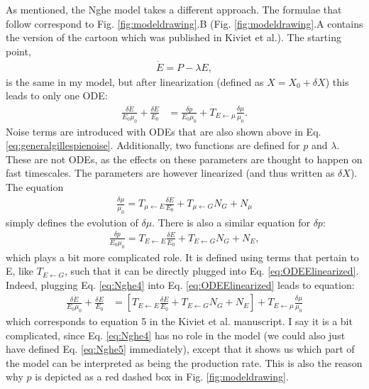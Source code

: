 As mentioned, the Nghe model takes a different approach. 
The formulae that follow correspond to Fig. \ref{fig:modeldrawing}.B (Fig. \ref{fig:modeldrawing}.A contains the version of the cartoon which was published in Kiviet et al.).
The starting point,
%
\begin{align}
\label{eq:Nghe1}
\dot{E} = P - \lambda E
,
\end{align}
%
is the same in my model, but after linearization (defined as $X=X_0+\delta X$) this leads to only one ODE:
%
\begin{align}
\label{eq:ODEElinearized}
\frac{ \delta{\dot{E}} }{E_0 \mu_0} 
+ \frac{\delta E}{E_0} 
& =
\frac{\delta p}{E_0 \mu_0} + T_{E \leftarrow \mu} \frac{\delta \mu}{\mu_0}
.
\end{align}
%
Noise terms are introduced with ODEs that are also shown above in Eq. \ref{eq:generalgillespienoise}.
 Additionally, two functions are defined for $p$ and $\lambda$. These are not ODEs, as the effects on these parameters are thought to happen on fast timescales. The parameters are however linearized (and thus written as $\delta X$). The equation
%
\begin{align}
\label{eq:Nghe3}
\frac{\delta\mu}{\mu_0} = T_{\mu \leftarrow E} \frac{\delta E}{E_0} + T_{\mu \leftarrow G} N_G + N_\mu
\end{align}
%
simply defines the evolution of $\delta \mu$.
There is also a similar equation for $\delta p$:
%
\begin{align}
\label{eq:Nghe4}
\frac{\delta{p}}{E_0 \mu_0} = T_{E \leftarrow E} \frac{\delta E}{E_0} + T_{E \leftarrow G} N_G + N_E
,
\end{align}
%
which plays a bit more complicated role.
It is defined using terms that pertain to E, like $T_{E \leftarrow G}$, such that it can be directly plugged into Eq. \ref{eq:ODEElinearized}. 
Indeed, plugging Eq. \ref{eq:Nghe4} into Eq. \ref{eq:ODEElinearized} leads to equation:
%
\begin{align}
\label{eq:Nghe5}
\frac{ \delta{\dot{E}} }{E_0 \mu_0} 
+ \frac{\delta E}{E_0} 
& = 
\left[
 T_{E \leftarrow E} \frac{\delta E}{E_0} + T_{E \leftarrow G} N_G + N_E 
 \right]
 + T_{E \leftarrow \mu} \frac{\delta \mu}{\mu_0} 
\end{align}
%
which corresponds to equation 5 in the Kiviet et al. \cite{Kiviet2014} manuscript.
I say it is a bit complicated, since Eq. \ref{eq:Nghe4} has no role in the model (we could also just have defined Eq. \ref{eq:Nghe5} immediately), except that it shows us which part of the model can be interpreted as being the production rate.
This is also the reason why $p$ is depicted as a red dashed box in Fig. \ref{fig:modeldrawing}.

